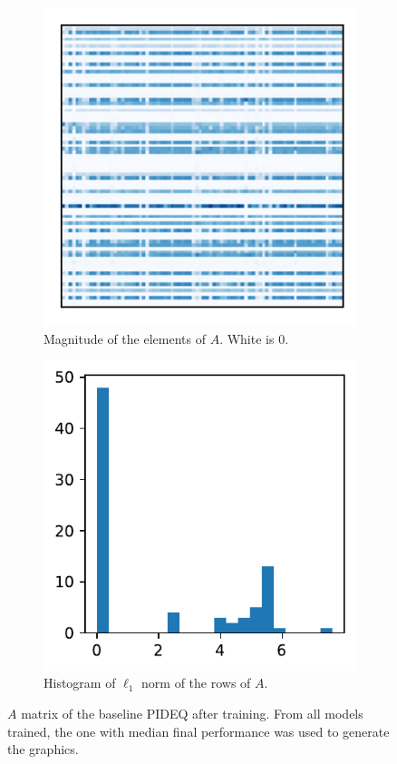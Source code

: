 \begin{figure}[h]
    \centering
    \begin{subfigure}[t]{.45\textwidth}
	\vspace{0pt}\includegraphics{images/exp_1_matplot.pdf}
	\caption{Magnitude of the elements of $A$. White is 0.}
    \end{subfigure}
    \begin{subfigure}[t]{.45\textwidth}
	\vspace{0pt}\includegraphics{images/exp_1_hist.pdf}
	\caption{Histogram of $\ell_1$ norm of the rows of $A$.}
    \end{subfigure}
    \caption{$A$ matrix of the baseline \gls{PIDEQ} after training. From all models trained, the one with median final performance was used to generate the graphics.}
    \label{fig:baseline-pideq-A}
\end{figure}


